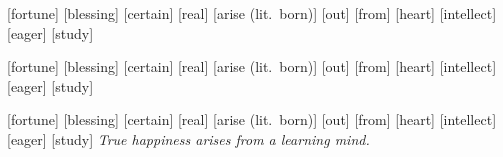 \documentclass{article}
\begin{document}
\pex[lingstyle=custom_nlevel, labeltype=caps]
\a \ipa{[ha: n\`Oj]}\par
\begingl
{}[fortune]
[blessing]
[certain]
[real]
[arise (lit.\ born)]
[out]
[from]
[heart]
[intellect]
[eager]
[study]
\endgl
\a \ipa{[hu@\super{P}]}\par
\begingl
{}[fortune]
[blessing]
[certain]
[real]
[arise (lit.\ born)]
[out]
[from]
[heart]
[intellect]
[eager]
[study]
\endgl
\a \ipa{[sa:\`I g\`On]}\par
\begingl
{}[fortune]
[blessing]
[certain]
[real]
[arise (lit.\ born)]
[out]
[from]
[heart]
[intellect]
[eager]
[study]
\glft \textit{True happiness arises from a learning mind.}
\endgl
\xe
\end{document}
